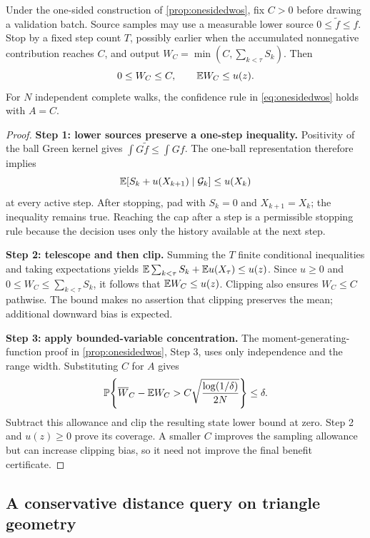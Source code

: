\begin{proposition}
\label{prop:clippedvalidation}
Under the one-sided construction of \cref{prop:onesidedwos}, fix $C>0$
before drawing a validation batch. Source samples may use a measurable
lower source $0\le\widetilde f\le f$. Stop by a fixed step count $T$,
possibly earlier when the accumulated nonnegative contribution reaches $C$,
and output $W_C=\min(C,\sum_{k<\tau}S_k)$. Then
\begin{equation}
 0\le W_C\le C,\qquad \mathbb{E} W_C\le u(z).
 \label{eq:clippedvalidation}
\end{equation}
For $N$ independent complete walks, the confidence rule in
\cref{eq:onesidedwos} holds with $A=C$.
\end{proposition}
\begin{proof}
\textbf{Step 1: lower sources preserve a one-step inequality.}
Positivity of the ball Green kernel gives
$\int G\widetilde f\le\int Gf$. The one-ball representation therefore
implies
\[
 \mathbb{E}[S_k+u(X_{k+1})\mid\mathcal G_k]\le u(X_k)
\]
at every active step. After stopping, pad with $S_k=0$ and
$X_{k+1}=X_k$; the inequality remains true. Reaching the cap after a step
is a permissible stopping rule because the decision uses only the history
available at the next step.

\textbf{Step 2: telescope and then clip.}
Summing the $T$ finite conditional inequalities and taking expectations yields
$\mathbb{E}\sum_{k<\tau}S_k+\mathbb{E} u(X_\tau)\le u(z)$.
Since $u\ge0$ and
$0\le W_C\le\sum_{k<\tau}S_k$, it follows that $\mathbb{E} W_C\le u(z)$.
Clipping also ensures $W_C\le C$ pathwise. The bound makes no assertion
that clipping preserves the mean; additional downward bias is expected.

\textbf{Step 3: apply bounded-variable concentration.}
The moment-generating-function proof in \cref{prop:onesidedwos}, Step 3,
uses only independence and the range width. Substituting $C$ for $A$ gives
\[
 \mathbb{P}\!\left\{\overline W_C-\mathbb{E} W_C>
 C\sqrt{\frac{\log(1/\delta)}{2N}}\right\}\le\delta.
\]
Subtract this allowance and clip the resulting state lower bound at zero.
Step 2 and $u(z)\ge0$ prove its coverage. A smaller $C$ improves the
sampling allowance but can increase clipping bias, so it need not improve
the final benefit certificate.
\end{proof}

\subsection{A conservative distance query on triangle geometry}

